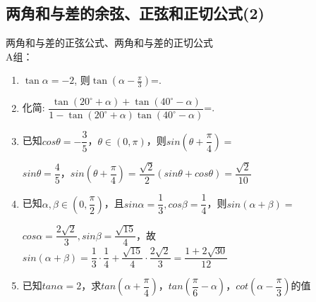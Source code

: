 \subsection{两角和与差的余弦、正弦和正切公式(2)}
\zsd 两角和与差的正弦公式、两角和与差的正切公式 \\
A组：
\begin{enumerate}
\item $\tan\alpha=-2$, 则$\tan\left(\alpha-\frac{\pi}{3}\right)$=. 
 
\item 化简: $\dfrac{\tan\left(20^{\circ}+\alpha\right)+\tan\left(40^{\circ}-\alpha\right)}{1-\tan\left(20^{\circ}+\alpha\right)\tan\left(40^{\circ}-\alpha\right)}$=. 
\item 已知$cos\theta = -\dfrac{3}{5}$，$\theta \in \left(0, \pi\right)$，则$sin\left(\theta + \dfrac{\pi}{4}\right) = $
\begin{jieda}
    $sin\theta = \dfrac{4}{5}$，$sin\left(\theta + \dfrac{\pi}{4}\right) = \dfrac{\sqrt{2}}{2}\left(sin\theta + cos\theta\right) = \dfrac{\sqrt{2}}{10}$
\end{jieda}
\item 已知$\alpha, \beta \in \left(0, \dfrac{\pi}{2}\right)$，且$sin\alpha = \dfrac{1}{3}, cos\beta = \dfrac{1}{4}$，则$sin\left(\alpha + \beta\right) = $
\begin{jieda}
    $cos\alpha = \dfrac{2\sqrt{2}}{3}, sin\beta = \dfrac{\sqrt{15}}{4}$，故$sin\left(\alpha + \beta\right) = \dfrac{1}{3} \cdot \dfrac{1}{4} + \dfrac{\sqrt{15}}{4} \cdot \dfrac{2\sqrt{2}}{3}  = \dfrac{1 + 2\sqrt{30}}{12}$
\end{jieda}
\item 已知$tan\alpha = 2$，求$tan\left(\alpha + \dfrac{\pi}{4}\right)$，$tan\left(\dfrac{\pi}{6} - \alpha\right)$，$cot\left(\alpha - \dfrac{\pi}{3}\right)$的值
\begin{jieda}
\end{jieda}
\end{enumerate}
